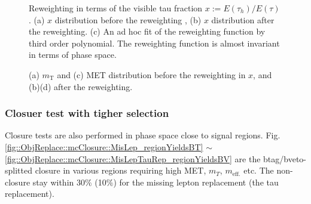 \begin{description}
\begin{figure}[h]
  \centering
    \caption{Reweighting in terms of the visible tau fraction $x := E(\tau_{h})/E(\tau)$. (a) $x$ distribution before the reweighting , (b) $x$ distribution after the reweighting. (c) An ad hoc fit of the reweighting function by third order polynomial. The reweighting function is almost invariant in terms of phase space.  \label{fig::ObjReplace::mcClosure::rwgt_x} }
\end{figure}

\begin{figure}[h]
  \centering
    \caption{ (a) $m_{\mathrm{T}}$ and (c) MET distribution before the reweighting in $x$, and (b)(d) after the reweighting.  \label{fig::ObjReplace::mcClosure::rwgt_x_mt} }
\end{figure}



\end{description}


\clearpage

\subsubsection{Closuer test with tigher selection} \label{sec::ObjReplace::mcClosure_tight} 
Closure tests are also performed in phase space close to signal regions. Fig. \ref{fig::ObjReplace::mcClosure::MisLep_regionYieldsBT} $\sim$ \ref{fig::ObjReplace::mcClosure::MisLepTauRep_regionYieldsBV} are the btag/bveto-splitted closure in various regions requiring high MET, $m_{T}$, $m_{\mathrm{eff.}}$ etc. The non-closure stay within 30$\%$ (10$\%$) for the missing lepton replacement (the tau replacement).\\

